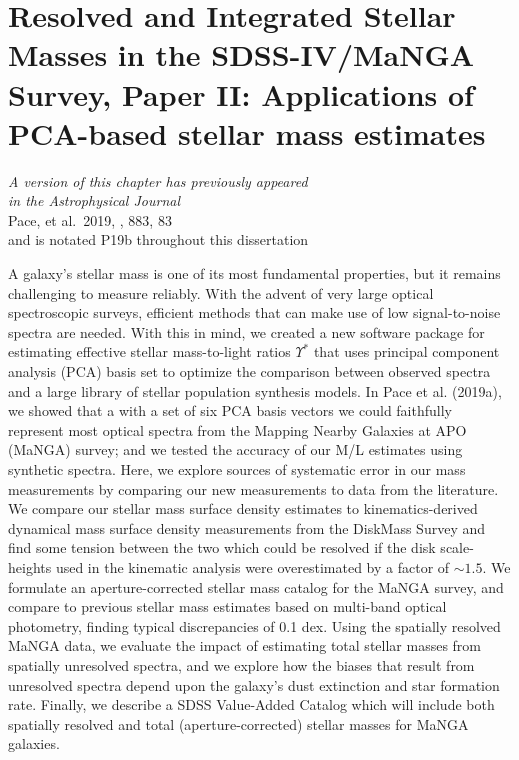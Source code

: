 \chapter[Applications of PCA-based stellar mass estimates]{Resolved and Integrated Stellar Masses in the SDSS-IV/MaNGA Survey, Paper II: Applications of PCA-based stellar mass estimates}
\label{chapter2}

\vfill

\begin{flushright}
    \fixspacing %
    \textit{A version of this chapter has previously appeared\\
        in the \emph{Astrophysical Journal}} \\ \vspace{1ex}
    Pace, et al.\ 2019, \apj, 883, 83 \\ \vspace{1ex}
    and is notated P19b throughout this dissertation
\end{flushright}

\vspace*{1in} %

\cleardoublepage

\begin{chabstract}
A galaxy's stellar mass is one of its most fundamental properties, but it remains challenging to measure reliably. With the advent of very large optical spectroscopic surveys, efficient methods that can make use of low signal-to-noise spectra are needed. With this in mind, we created a new software package for estimating effective stellar mass-to-light ratios $\Upsilon^*$ that uses principal component analysis (PCA) basis set to optimize the comparison between observed spectra and a large library of stellar population synthesis models. In Pace et al. (2019a), we showed that a with a set of six PCA basis vectors we could faithfully represent most optical spectra from the Mapping Nearby Galaxies at APO (MaNGA) survey; and we tested the accuracy of our M/L estimates using synthetic spectra. Here, we explore sources of systematic error in our mass measurements by comparing our new measurements to data  from the literature. We compare our stellar mass surface density estimates to kinematics-derived dynamical mass surface density measurements from the DiskMass Survey and find some tension between the two which could be resolved if the disk scale-heights used in the kinematic analysis were overestimated by a factor of $\sim1.5$. We formulate an aperture-corrected stellar mass catalog for the MaNGA survey, and compare to previous stellar mass estimates based on multi-band optical photometry, finding typical discrepancies of 0.1 dex. Using the spatially resolved MaNGA data, we evaluate the impact of estimating total stellar masses from spatially unresolved spectra, and we explore how the biases that result from unresolved spectra depend upon the galaxy’s dust extinction and star formation rate. Finally, we describe a SDSS Value-Added Catalog which will include both spatially resolved and total (aperture-corrected) stellar masses for MaNGA galaxies.
\end{chabstract}
\cleardoublepage